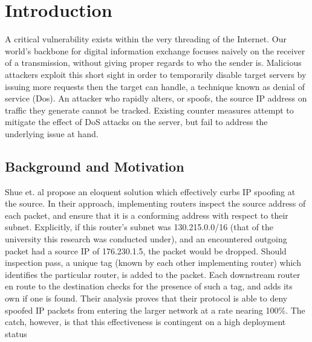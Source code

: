 \documentclass[12pt]{article} %
\begin{document}

\newpage %



\section{Introduction}

A critical vulnerability exists within the very threading of the Internet. Our world's backbone for digital information exchange focuses naively on the receiver of a transmission, without giving proper regards to who the sender is. Malicious attackers exploit this short sight in order to temporarily disable target servers by issuing more requests then the target can handle, a technique known as denial of service (Dos). An attacker who rapidly alters, or spoofs, the source IP address on traffic they generate cannot be tracked. Existing counter measures attempt to mitigate the effect of DoS attacks on the server, but fail to address the underlying issue at hand. 

\subsection{Background and Motivation}
Shue et. al propose an eloquent solution which effectively curbs IP spoofing at the source. In their approach, implementing routers inspect the source address of each packet, and ensure that it is a conforming address with respect to their subnet\cite{Shue20081567}. Explicitly, if this router's subnet was 130.215.0.0/16 (that of the university this research was conducted under), and an encountered outgoing packet had a source IP of 176.230.1.5, the packet would be dropped. Should inspection pass, a unique tag (known by each other implementing router) which identifies the particular router, is added to the packet. Each downstream router en route to the destination checks for the presence of such a tag, and adds its own if one is found. Their analysis proves that their protocol is able to deny spoofed IP packets from entering the larger network at a rate nearing 100\%. The catch, however, is that this effectiveness is contingent on a high deployment status
\end{document}
